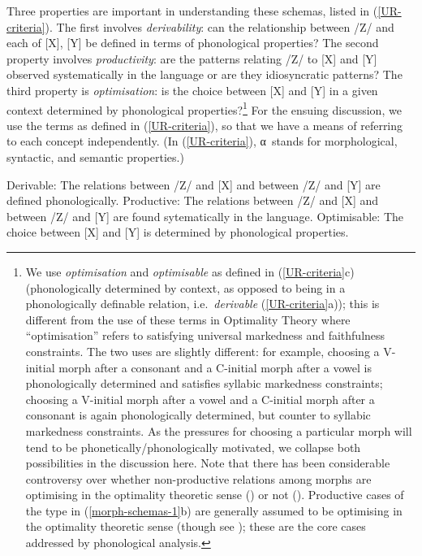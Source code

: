 Three properties are important in understanding these schemas, listed in (\ref{UR-criteria}). The first involves {\it derivability}: can the relationship between /Z/ and each of [X],  [Y] be defined in terms of phonological properties? The second property involves {\it productivity}: are the patterns relating /Z/ to [X] and [Y] observed  systematically in the language or are they idiosyncratic patterns? The third property is {\it optimisation}: is the choice between [X] and [Y] in a given context determined by phonological properties?\footnote{We use \textit{optimisation} and \textit{optimisable} as defined in (\ref{UR-criteria}c)  (phonologically determined by context, as opposed to being in a phonologically definable relation, i.e.\ \textit{derivable} (\ref{UR-criteria}a)); this is different from the use of these terms in Optimality Theory where ``optimisation'' refers to satisfying universal markedness and faithfulness constraints. The two uses are slightly different: for example, choosing a V-initial morph after a consonant and a C-initial morph after a vowel is phonologically determined and satisfies syllabic markedness constraints; choosing a V-initial morph after a vowel and a C-initial morph after a consonant is again phonologically determined, but counter to syllabic markedness constraints. As the pressures for choosing a particular morph will tend to be  phonetically/phonologically motivated, we collapse both possibilities in the discussion here. Note that there has been considerable controversy over whether non-productive relations among morphs are optimising in the optimality theoretic sense (\citealt{Kager:1996, Rubach+:2001, McCarthy:2002}) or not (\citealt{Paster:2005wccfl, Paster:2006, Bye:2007}). Productive cases of the type in (\ref{morph-schemas-1}b) are generally assumed to be optimising in the optimality theoretic sense (though see \citealt{Ford+:1983}); these are the core cases addressed by phonological analysis.} For the ensuing discussion, we use the terms as defined in (\ref{UR-criteria}), so that we have a means of referring to each concept independently.  (In (\ref{UR-criteria}), α\ stands for  morphological, syntactic, and semantic properties.)


\begin{example}  \label{UR-criteria}
\ea Derivable: The relations between /Z/ and [X] and between /Z/ and [Y] are defined phonologically.
\ex Productive: The relations between /Z/ and [X] and between /Z/ and [Y] are found sytematically in the language.
\ex Optimisable: The choice between [X] and [Y] is determined by phonological properties.
\z
\end{example}

